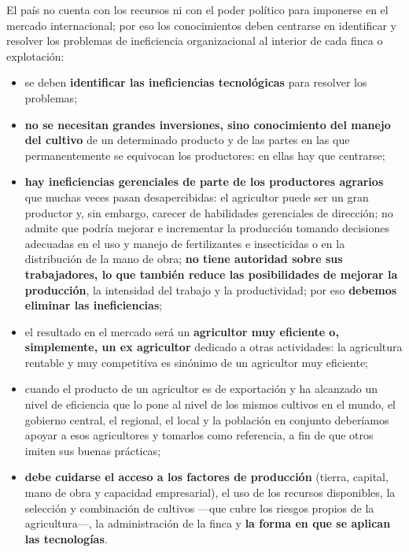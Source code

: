\documentclass[
  man,
  floatsintext,
  longtable,
  a4paper,
  nolmodern,
  notxfonts,
  notimes,
  12pt,
  colorlinks=true,linkcolor=blue,citecolor=blue,urlcolor=blue]{apa7}
\providecommand{\tightlist}{%
  \setlength{\itemsep}{0pt}\setlength{\parskip}{0pt}}
\begin{document}
El país no cuenta con los recursos ni con el poder político para
imponerse en el mercado internacional; por eso los conocimientos deben
centrarse en identificar y resolver los problemas de ineficiencia
organizacional al interior de cada finca o explotación:

\begin{itemize}
\tightlist
\item
  se deben \textbf{identificar las ineficiencias tecnológicas} para
  resolver los problemas;
\item
  \textbf{no se necesitan grandes inversiones, sino conocimiento del
  manejo del cultivo} de un determinado producto y de las partes en las
  que permanentemente se equivocan los productores: en ellas hay que
  centrarse;
\item
  \textbf{hay ineficiencias gerenciales de parte de los productores
  agrarios} que muchas veces pasan desapercibidas: el agricultor puede
  ser un gran productor y, sin embargo, carecer de habilidades
  gerenciales de dirección; no admite que podría mejorar e incrementar
  la producción tomando decisiones adecuadas en el uso y manejo de
  fertilizantes e insecticidas o en la distribución de la mano de obra;
  \textbf{no tiene autoridad sobre sus trabajadores, lo que también
  reduce las posibilidades de mejorar la producción}, la intensidad del
  trabajo y la productividad; por eso \textbf{debemos eliminar las
  ineficiencias};
\item
  el resultado en el mercado será un \textbf{agricultor muy eficiente o,
  simplemente, un ex agricultor} dedicado a otras actividades: la
  agricultura rentable y muy competitiva es sinónimo de un agricultor
  muy eficiente;
\item
  cuando el producto de un agricultor es de exportación y ha alcanzado
  un nivel de eficiencia que lo pone al nivel de los mismos cultivos en
  el mundo, el gobierno central, el regional, el local y la población en
  conjunto deberíamos apoyar a esos agricultores y tomarlos como
  referencia, a fin de que otros imiten sus buenas prácticas;
\item
  \textbf{debe cuidarse el acceso a los factores de producción} (tierra,
  capital, mano de obra y capacidad empresarial), el uso de los recursos
  disponibles, la selección y combinación de cultivos ---que cubre los
  riesgos propios de la agricultura---, la administración de la finca y
  \textbf{la forma en que se aplican las tecnologías}.
\end{itemize}
\end{document}
